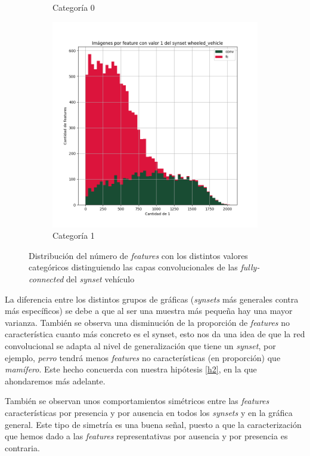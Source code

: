 \documentclass[12,twoside]{TFG-GM}
\theoremstyle{definition}
\theoremstyle{remark}
\begin{document}
\begin{figure}[ht]
\begin{subfigure}[b]{0.3\textwidth}
		\caption{Categoría 0}
	\end{subfigure}
	\begin{subfigure}[b]{0.3\textwidth}
		\includegraphics[width=\textwidth]  {Images/plots/25/synsets/Images_per_feature_of_1_category_wheeled_vehicleall_layers.png}
		\caption{Categoría 1}
	\end{subfigure}       
	\caption{Distribución del número de \textit{features} con los distintos valores categóricos distinguiendo las capas convolucionales de las \textit{fully-connected} del \textit{synset} vehículo \label{fig:imagesperfeaturewheel}}
\end{figure}

La diferencia entre los distintos grupos de gráficas (\textit{synsets} más generales contra más específicos) se debe a que al ser una muestra más pequeña hay una mayor varianza. También se observa una disminución de la proporción de \textit{features} no característica cuanto más concreto es el synset, esto nos da una idea de que la red convolucional se adapta al nivel de generalización que tiene un \textit{synset}, por ejemplo, \textit{perro} tendrá menos \textit{features} no características (en proporción) que \textit{mamífero}. Este hecho concuerda con nuestra hipótesis \ref{h2}, en la que ahondaremos más adelante.

También se observan unos comportamientos simétricos entre las \textit{features} características por presencia y por ausencia en todos los \textit{synsets} y en la gráfica general. Este tipo de simetría es una buena señal, puesto a que la caracterización que hemos dado a las \textit{features} representativas por ausencia y por presencia es contraria.  
\end{document}
